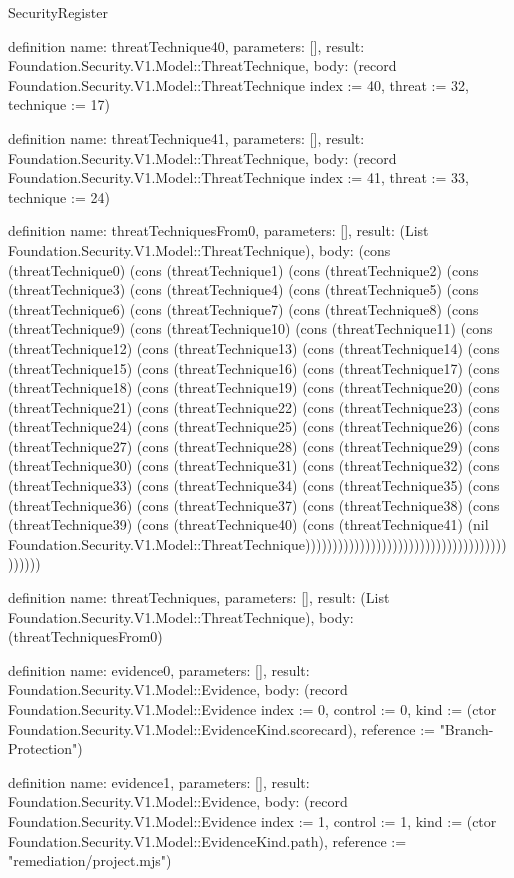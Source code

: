 \begin{lexlean}{SecurityRegister}
\begin{semanticmodule}
definition{
  name: threatTechnique40,
  parameters: [],
  result: Foundation.Security.V1.Model::ThreatTechnique,
  body: (record Foundation.Security.V1.Model::ThreatTechnique {index := 40, threat := 32, technique := 17})
}

definition{
  name: threatTechnique41,
  parameters: [],
  result: Foundation.Security.V1.Model::ThreatTechnique,
  body: (record Foundation.Security.V1.Model::ThreatTechnique {index := 41, threat := 33, technique := 24})
}

definition{
  name: threatTechniquesFrom0,
  parameters: [],
  result: (List Foundation.Security.V1.Model::ThreatTechnique),
  body: (cons (threatTechnique0) (cons (threatTechnique1) (cons (threatTechnique2) (cons (threatTechnique3) (cons (threatTechnique4) (cons (threatTechnique5) (cons (threatTechnique6) (cons (threatTechnique7) (cons (threatTechnique8) (cons (threatTechnique9) (cons (threatTechnique10) (cons (threatTechnique11) (cons (threatTechnique12) (cons (threatTechnique13) (cons (threatTechnique14) (cons (threatTechnique15) (cons (threatTechnique16) (cons (threatTechnique17) (cons (threatTechnique18) (cons (threatTechnique19) (cons (threatTechnique20) (cons (threatTechnique21) (cons (threatTechnique22) (cons (threatTechnique23) (cons (threatTechnique24) (cons (threatTechnique25) (cons (threatTechnique26) (cons (threatTechnique27) (cons (threatTechnique28) (cons (threatTechnique29) (cons (threatTechnique30) (cons (threatTechnique31) (cons (threatTechnique32) (cons (threatTechnique33) (cons (threatTechnique34) (cons (threatTechnique35) (cons (threatTechnique36) (cons (threatTechnique37) (cons (threatTechnique38) (cons (threatTechnique39) (cons (threatTechnique40) (cons (threatTechnique41) (nil Foundation.Security.V1.Model::ThreatTechnique)))))))))))))))))))))))))))))))))))))))))))
}

definition{
  name: threatTechniques,
  parameters: [],
  result: (List Foundation.Security.V1.Model::ThreatTechnique),
  body: (threatTechniquesFrom0)
}

definition{
  name: evidence0,
  parameters: [],
  result: Foundation.Security.V1.Model::Evidence,
  body: (record Foundation.Security.V1.Model::Evidence {index := 0, control := 0, kind := (ctor Foundation.Security.V1.Model::EvidenceKind.scorecard), reference := "Branch-Protection"})
}

definition{
  name: evidence1,
  parameters: [],
  result: Foundation.Security.V1.Model::Evidence,
  body: (record Foundation.Security.V1.Model::Evidence {index := 1, control := 1, kind := (ctor Foundation.Security.V1.Model::EvidenceKind.path), reference := "remediation/project.mjs"})
}


\end{semanticmodule}
\end{lexlean}
